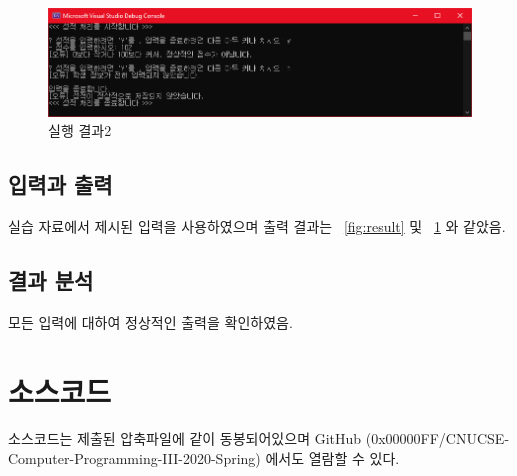 \documentclass[UTF8]{report}
\begin{document}
        \begin{figure}[h]
            \centering
            \includegraphics[width=\textwidth]{result_2.png}
            \caption{실행 결과2}
            \label{fig:result2}
        \end{figure}
        
        
        \section{입력과 출력}
            실습 자료에서 제시된 입력을 사용하였으며 출력 결과는 ~\ref{fig:result} 및 ~\ref{fig:result2} 와 같았음.
        \section{결과 분석}
            모든 입력에 대하여 정상적인 출력을 확인하였음.

    \chapter{소스코드}
        소스코드는 제출된 압축파일에 같이 동봉되어있으며 GitHub (0x00000FF/CNUCSE-Computer-Programming-III-2020-Spring) 에서도 열람할 수 있다.
\end{document}
